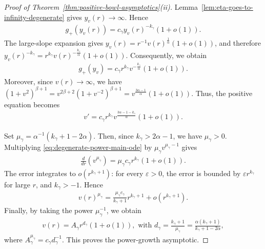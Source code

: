 \documentclass{amsart}
\theoremstyle{plain}
\theoremstyle{mainintrothm}
\theoremstyle{definition}
\begin{document}
	\begin{proof}[Proof of Theorem~\ref{thm:positive-bowl-asymptotics}\textup{(ii)}]
		Lemma~\ref{lem:eta-goes-to-infinity-degenerate} gives
		$y_v(r)\to\infty$.  Hence
		\begin{align*}
			g_+(y_v(r))
			=
			c_\gamma y_v(r)^{-k_\gamma}(1+o(1)).
		\end{align*}
		The large-slope expansion gives $y_v(r)=r^{-1}v(r)^{\frac{1}{\alpha}}(1+o(1))$,
		and therefore $y_v(r)^{-k_\gamma}=r^{k_\gamma}v(r)^{-\frac{k_\gamma}{\alpha}}(1+o(1))$. Consequently, we obtain 
		\begin{align*}
			g_+(y_v)
			=
			c_\gamma r^{k_\gamma}v^{-\frac{k_\gamma}{\alpha}}(1+o(1)).
		\end{align*}
		Moreover, since $v(r)\to\infty$, we have $(1+v^2)^{\beta+1}=v^{2\beta+2}(1+v^{-2})^{\beta+1}=v^{\frac{3\alpha-1}{\alpha}}(1+o(1))$. Thus, the positive equation becomes
		\begin{align}
			\label{eq:degenerate-power-main-ode}
			v'
			=
			c_\gamma r^{k_\gamma}
			v^{\frac{3\alpha-1-k_\gamma}{\alpha}}(1+o(1)).
		\end{align}
		
		Set $\mu_\gamma=\alpha^{-1}(k_\gamma+1-2\alpha)$.  Then, since 
		$k_\gamma>2\alpha-1$, we have $\mu_\gamma>0$.  Multiplying
		\eqref{eq:degenerate-power-main-ode} by
		$\mu_\gamma v^{\mu_\gamma-1}$ gives
		\begin{align*}
			\frac{d}{dr}\left(v^{\mu_\gamma}\right)
			=
			\mu_\gamma c_\gamma r^{k_\gamma}(1+o(1)).
		\end{align*}
		The error integrates to $o(r^{k_\gamma+1})$: for every $\varepsilon>0$, the
		error is bounded by $\varepsilon r^{k_\gamma}$ for large $r$, and
		$k_\gamma>-1$.  Hence
		\begin{align*}
			v(r)^{\mu_\gamma}
			=
			\frac{\mu_\gamma c_\gamma}{k_\gamma+1}r^{k_\gamma+1}
			+
			o(r^{k_\gamma+1}).
		\end{align*}
		Finally, by taking the power $\mu_\gamma^{-1}$, we obtain 
		\begin{align*}
			v(r)
			=
			A_\gamma r^{d_\gamma}(1+o(1)),
			\mbox{ with }
			d_\gamma
			=
			\frac{k_\gamma+1}{\mu_\gamma}
			=
			\frac{\alpha(k_\gamma+1)}{k_\gamma+1-2\alpha},
		\end{align*}
		where $A_\gamma^{\mu_\gamma}=c_\gamma d_\gamma^{-1}$. This proves the power-growth asymptotic.
	\end{proof}
	
\end{document}

